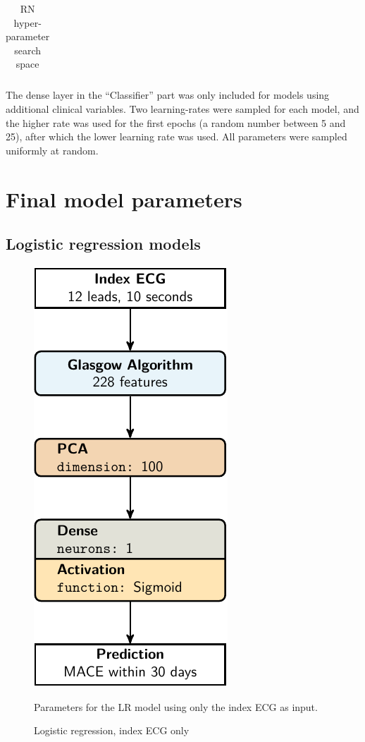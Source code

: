 \documentclass[preprint]{elsarticle}
\begin{document}
\begin{table}[H]
\begin{adjustbox}{center}
\begin{tabular}{@{}lr@{}}
\bottomrule
\end{tabular}
\end{adjustbox}
\caption{RN hyper-parameter search space}
\medskip
\small
The dense layer in the ``Classifier'' part was only included for models using additional clinical variables. Two learning-rates were sampled for each model, and the higher rate was used for the first epochs (a random number between 5 and 25), after which the lower learning rate was used. All parameters were sampled uniformly at random.
\label{table:rn}
\end{table}


\section{Final model parameters}
\label{sec:finalparameters}

\def\modelscale{0.55}

\subsection{Logistic regression models}
\begin{figure}[H]
\centering
\includegraphics[scale=\modelscale,keepaspectratio]{figures/model-lr1.pdf}
\caption{Logistic regression, index ECG only}
\medskip
\small
Parameters for the LR model using only the index ECG as input. 
\end{figure}
\end{document}

